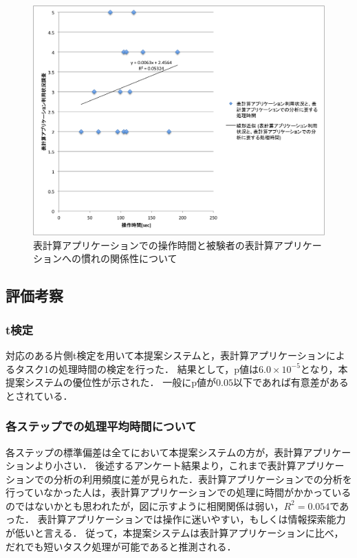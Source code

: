 \documentclass[sotsuron]{kuee}
\begin{document}
			\begin{figure}
				\begin{center}
					\includegraphics[width=\linewidth]{./png/result05.png}
				\end{center}
				\caption{表計算アプリケーションでの操作時間と被験者の表計算アプリケーションへの慣れの関係性について}
		  		\label{fig:result05}
			\end{figure}
		\subsection{評価考察}
			\subsubsection{t検定}
				対応のある片側t検定を用いて本提案システムと，表計算アプリケーションによるタスク1の処理時間の検定を行った．
				結果として，p値は$6.0 \times 10^{-5}$となり，本提案システムの優位性が示された．
				一般にp値が$0.05$以下であれば有意差があるとされている．
			\subsubsection{各ステップでの処理平均時間について}
				各ステップの標準偏差は全てにおいて本提案システムの方が，表計算アプリケーションより小さい．
				後述するアンケート結果より，これまで表計算アプリケーションでの分析の利用頻度に差が見られた．表計算アプリケーションでの分析を行っていなかった人は，表計算アプリケーションでの処理に時間がかかっているのではないかとも思われたが，図に示すように相関関係は弱い，$R^2 = 0.054$であった．
				表計算アプリケーションでは操作に迷いやすい，もしくは情報探索能力が低いと言える．
				従って，本提案システムは表計算アプリケーションに比べ，だれでも短いタスク処理が可能であると推測される．
\end{document}
